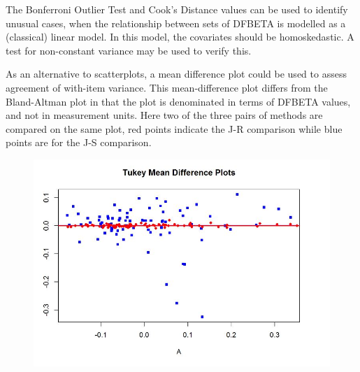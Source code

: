 \documentclass[12pt, a4paper]{report}
\theoremstyle{definition}
\theoremstyle{remark}
\begin{document}

The Bonferroni Outlier Test and Cook's Distance values can be used to identify unusual cases, when the relationship between sets of DFBETA is modelled as a (classical) linear model. In this model, the covariates should be homoskedastic. A test for non-constant variance may be used to verify this. 


As an alternative to scatterplots, a mean difference plot could be used to assess agreement of with-item variance. This mean-difference plot differs from the Bland-Altman plot in that the plot is denominated in terms of DFBETA values, and not in measurement units. Here two of the three pairs of methods are compared on the same plot, red points indicate the J-R comparison while blue points are for the J-S comparison.

\begin{figure}[h!
]
\centering
\includegraphics[width=0.7\linewidth]{images/04-TMDplot}

\end{figure}








\end{document}

